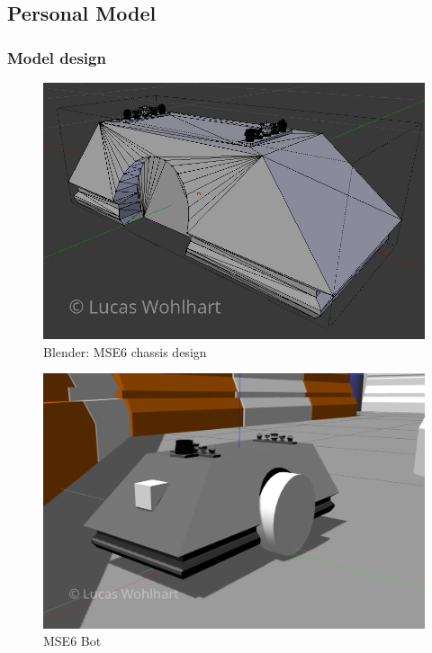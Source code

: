 \documentclass[10pt,journal,compsoc]{IEEEtran}
\begin{document}
\subsection{Personal Model}
\subsubsection{Model design}
\begin{figure}[thpb]
      \centering
      \includegraphics[width=\linewidth]{img/blender_mse6_chassis}
      \caption{Blender: MSE6 chassis design}
      \label{fig:blender_design_mse6}
\end{figure}

\begin{figure}[thpb]
      \centering
      \includegraphics[width=\linewidth]{img/lw_mse6_bot}
      \caption{MSE6 Bot}
      \label{fig:mse6_bot}
\end{figure}
\end{document}
